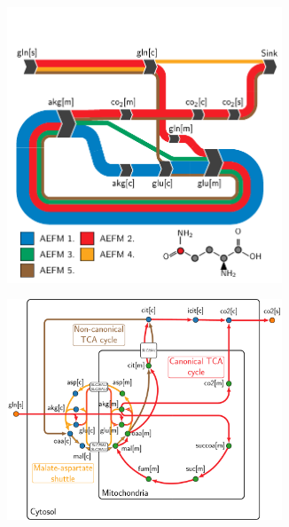 \documentclass[varwidth]{standalone}
\begin{document}
\begin{figure}
\begin{subfigure}[t]{0.495\textwidth}
    \end{subfigure}
    \begin{subfigure}[t]{0.495\textwidth}
        \caption{}
        \centering
        \includegraphics[width=0.9\textwidth,trim={0.0cm 0.0cm 0.0cm 1.0cm},clip]{subpanels-c-f/glutamine/carbon-5/04-add-labels/add-labels.pdf}
    \end{subfigure}
    \begin{subfigure}[t]{0.495\textwidth}
        \caption{}
        \centering
        \includegraphics[width=0.9\textwidth,trim={0.0cm 0.0cm 0.0cm 0.0cm},clip]{subpanels-c-f/glutamine/network-mapping/network.pdf}
    \end{subfigure}
\end{figure}
\end{document}
